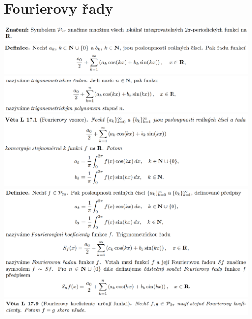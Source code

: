 \documentclass[12pt,a4paper]{article}
\begin{document}
\section{Fourierovy řady}
	\begin{center}
		\includegraphics[width=\textwidth]{img/4four/2020-06-21 11 43 15.png}\vspace{0.3cm}
		\includegraphics[width=\textwidth]{img/4four/2020-06-21 11 43 21.png}\vspace{0.3cm}
		\includegraphics[width=\textwidth]{img/4four/2020-06-21 11 43 32.png}\vspace{0.3cm}
		\includegraphics[width=\textwidth]{img/4four/2020-06-21 11 43 53.png}\vspace{0.3cm}
		\includegraphics[width=\textwidth]{img/4four/2020-06-21 11 44 04.png}\vspace{0.3cm}
		\includegraphics[width=\textwidth]{img/4four/2020-06-21 11 50 25.png}\vspace{0.3cm}

\end{center}
\end{document}
